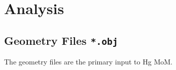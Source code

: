 % 

\section{Analysis}


\subsection{Geometry Files \texttt{*.obj}}
The geometry files are the primary input to Hg MoM.


\endinput  %
